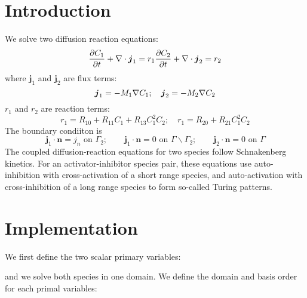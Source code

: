 \hypertarget{growth_Introduction}{}\section{Introduction}\label{growth_Introduction}
We solve two diffusion reaction equations\+: \[ \frac{\partial C_\text{1}}{\partial t}+\nabla\cdot\boldsymbol{j}_1=r_1 \\ \frac{\partial C_\text{2}}{\partial t}+\nabla\cdot\boldsymbol{j}_2=r_2 \] where $\boldsymbol{j}_1 $ and $\boldsymbol{j}_2 $ are flux terms\+: \[ \boldsymbol{j}_1=-M_1\nabla C_\text{1}; \quad \boldsymbol{j}_2=-M_2\nabla C_\text{2}\\ \] $r_1$ and $r_2$ are reaction terms\+: \[ r_1= R_{10}+R_{11}C_1+R_{13}C_1^2C_2; \quad r_1= R_{20}+R_{21}C_1^2C_2 \] The boundary condiiton is \[ \boldsymbol{j}_1\cdot\boldsymbol{n}=j_n \text{ on }\Gamma_2;\quad \quad \boldsymbol{j}_1\cdot\boldsymbol{n}=0 \text{ on }\Gamma \backslash \Gamma_2; \quad \quad \boldsymbol{j}_2\cdot\boldsymbol{n}=0 \text{ on }\Gamma \] The coupled diffusion-\/reaction equations for two species follow Schnakenberg kinetics. For an activator-\/inhibitor species pair, these equations use auto-\/inhibition with cross-\/activation of a short range species, and auto-\/activation with cross-\/inhibition of a long range species to form so-\/called Turing patterns.\hypertarget{growth_imple}{}\section{Implementation}\label{growth_imple}
We first define the two scalar primary variables\+: 
\begin{DoxyCode}{0}
\end{DoxyCode}
 and we solve both species in one domain. We define the domain and basis order for each primal variables\+: 
\begin{DoxyCode}{0}
\end{DoxyCode}
